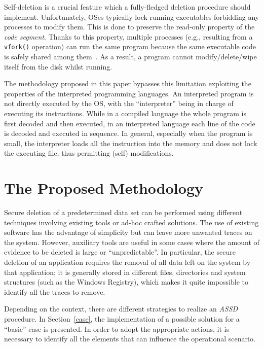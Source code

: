 \documentclass[conference]{IEEEtran}
\newcommand{\assd}{\emph{ASSD}\xspace}
\begin{document}

Self-deletion is a crucial feature which a fully-fledged deletion procedure should implement. Unfortunately, OSes typically lock running executables forbidding any processes to modify them.
This is done to preserve the read-only property of the \textit{code segment}. Thanks to this property, multiple processes (e.g., resulting from a \verb=vfork()= operation) can run the same program because the same executable code is safely shared among them~\cite{os}.
As a result, a program cannot modify/delete/wipe itself from the disk whilst running.

The methodology proposed in this paper bypasses this limitation exploiting the properties of the interpreted programming languages. An interpreted program is not directly executed by the OS, with the ``interpreter'' being in charge of executing its instructions. While in a compiled language the whole program is first decoded and then executed, in an interpreted language each line of the code is decoded and executed in sequence. In general, especially when the program is small, the interpreter loads all the instruction into the memory and does not lock the executing file, thus permitting (self) modifications.


\section{The Proposed Methodology}
Secure deletion of a predetermined data set can be performed using different techniques involving existing tools or ad-hoc crafted solutions. The use of existing software has the advantage of simplicity but can leave more unwanted traces on the system. However, auxiliary tools are useful in some cases where the amount of evidence to be deleted is large or ``unpredictable''. In particular, the secure deletion of an application requires the removal of all data left on the system by that application; it is generally stored in different files, directories and system structures (such as the Windows Registry), which makes it quite impossible to identify all the traces to remove.

Depending on the context, there are different strategies to realize an \assd procedure.
In Section~\ref{case}, the implementation of a possible solution for a ``basic'' case is presented.
In order to adopt the appropriate actions, it is necessary to identify all the elements that can influence the operational scenario.
\end{document}
